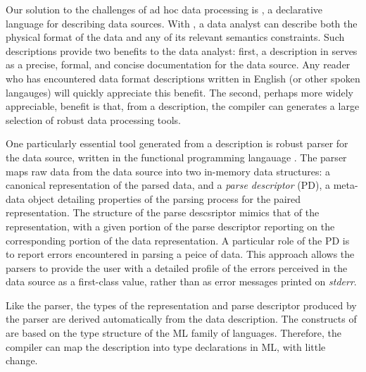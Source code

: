 Our solution to the challenges of ad hoc data processing is \padsml{},
a declarative language for describing data sources.  With \padsml{}, a
data analyst can describe both the physical format of the data and any
of its relevant semantics constraints. Such descriptions provide two
benefits to the data analyst: first, a description in \padsml{} serves
as a precise, formal, and concise documentation for the data source.
Any reader who has encountered data format descriptions written in
English (or other spoken langauges) will quickly appreciate this
benefit. The second, perhaps more widely appreciable, benefit is that,
from a description, the \padsml{} compiler can generates a large
selection of robust data processing tools.

One particularly essential tool generated from a description is robust
parser for the data source, written in the functional programming
langauage \ocaml{}.  The parser maps raw data from the data source
into two in-memory data structures: a canonical representation of the
parsed data, and a \textit{parse descriptor} (PD), a meta-data object
detailing properties of the parsing process for the paired
representation. The structure of the parse descsriptor mimics that of
the representation, with a given portion of the parse descriptor
reporting on the corresponding portion of the data representation. A
particular role of the PD is to report errors encountered in parsing a
peice of data.  This approach allows the parsers to provide the user
with a detailed profile of the errors perceived in the data source as
a first-class value, rather than as error messages printed on
\textit{stderr}.

Like the parser, the types of the representation and parse descriptor
produced by the parser are derived automatically from the data description. The
constructs of \padsml{} are based on the type structure of the ML
family of languages. Therefore, the compiler can map the description
into type declarations in ML, with little change.

